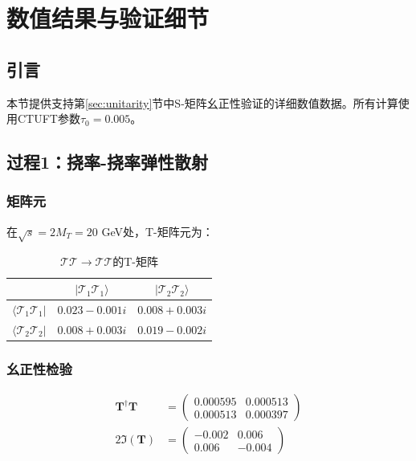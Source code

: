 \section{数值结果与验证细节}
\label{sec:numerical_results}

\subsection{引言}

本节提供支持第\ref{sec:unitarity}节中S-矩阵幺正性验证的详细数值数据。所有计算使用CTUFT参数$\tau_0 = 0.005$。

\subsection{过程1：挠率-挠率弹性散射}

\subsubsection{矩阵元}

在$\sqrt{s} = 2M_T = 20$ GeV处，T-矩阵元为：

\begin{table}[h]
\centering
\caption{$\mathcal{T}\mathcal{T} \to \mathcal{T}\mathcal{T}$的T-矩阵}
\begin{tabular}{|c|cc|}
\hline
 & $|\mathcal{T}_1\mathcal{T}_1\rangle$ & $|\mathcal{T}_2\mathcal{T}_2\rangle$ \\
\hline
$\langle\mathcal{T}_1\mathcal{T}_1|$ & $0.023 - 0.001i$ & $0.008 + 0.003i$ \\
$\langle\mathcal{T}_2\mathcal{T}_2|$ & $0.008 + 0.003i$ & $0.019 - 0.002i$ \\
\hline
\end{tabular}
\end{table}

\subsubsection{幺正性检验}

\begin{align}
    \mathbf{T}^\dagger \mathbf{T} &= \begin{pmatrix} 0.000595 & 0.000513 \\ 0.000513 & 0.000397 \end{pmatrix} \\
    2\Im(\mathbf{T}) &= \begin{pmatrix} -0.002 & 0.006 \\ 0.006 & -0.004 \end{pmatrix}
\end{align}

